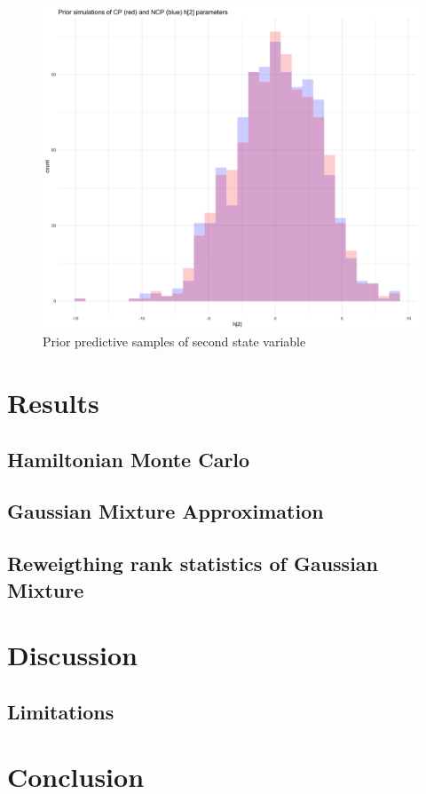 \documentclass[12pt, a4paper]{article}
\begin{document}
        \begin{figure}[h]
            \centering
            \includegraphics[scale=0.1]{figures/ppc_h2.png}
            \caption{Prior predictive samples of second state variable}
        \end{figure}
        


\section{Results}

    \subsection{Hamiltonian Monte Carlo}

    \subsection{Gaussian Mixture Approximation}

    \subsection{Reweigthing rank statistics of Gaussian Mixture}

\section{Discussion}

\subsection{Limitations}

\section{Conclusion}

\newpage


\end{document}
